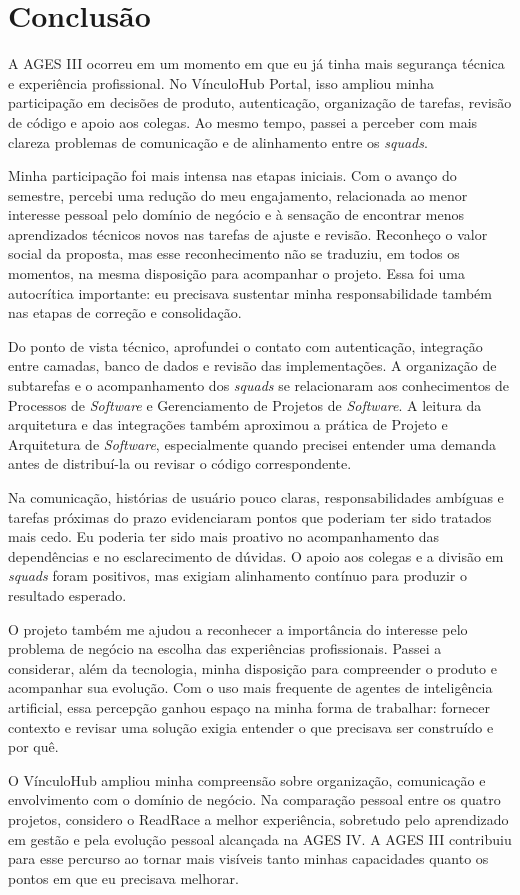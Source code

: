 \section{Conclusão}

A \ac{AGES} III ocorreu em um momento em que eu já tinha mais segurança técnica e experiência profissional. No VínculoHub Portal, isso ampliou minha participação em decisões de produto, autenticação, organização de tarefas, revisão de código e apoio aos colegas. Ao mesmo tempo, passei a perceber com mais clareza problemas de comunicação e de alinhamento entre os \textit{squads}.

Minha participação foi mais intensa nas etapas iniciais. Com o avanço do semestre, percebi uma redução do meu engajamento, relacionada ao menor interesse pessoal pelo domínio de negócio e à sensação de encontrar menos aprendizados técnicos novos nas tarefas de ajuste e revisão. Reconheço o valor social da proposta, mas esse reconhecimento não se traduziu, em todos os momentos, na mesma disposição para acompanhar o projeto. Essa foi uma autocrítica importante: eu precisava sustentar minha responsabilidade também nas etapas de correção e consolidação.

Do ponto de vista técnico, aprofundei o contato com autenticação, integração entre camadas, banco de dados e revisão das implementações. A organização de subtarefas e o acompanhamento dos \textit{squads} se relacionaram aos conhecimentos de Processos de \textit{Software} e Gerenciamento de Projetos de \textit{Software}. A leitura da arquitetura e das integrações também aproximou a prática de Projeto e Arquitetura de \textit{Software}, especialmente quando precisei entender uma demanda antes de distribuí-la ou revisar o código correspondente.

Na comunicação, histórias de usuário pouco claras, responsabilidades ambíguas e tarefas próximas do prazo evidenciaram pontos que poderiam ter sido tratados mais cedo. Eu poderia ter sido mais proativo no acompanhamento das dependências e no esclarecimento de dúvidas. O apoio aos colegas e a divisão em \textit{squads} foram positivos, mas exigiam alinhamento contínuo para produzir o resultado esperado.

O projeto também me ajudou a reconhecer a importância do interesse pelo problema de negócio na escolha das experiências profissionais. Passei a considerar, além da tecnologia, minha disposição para compreender o produto e acompanhar sua evolução. Com o uso mais frequente de agentes de inteligência artificial, essa percepção ganhou espaço na minha forma de trabalhar: fornecer contexto e revisar uma solução exigia entender o que precisava ser construído e por quê.

O VínculoHub ampliou minha compreensão sobre organização, comunicação e envolvimento com o domínio de negócio. Na comparação pessoal entre os quatro projetos, considero o ReadRace a melhor experiência, sobretudo pelo aprendizado em gestão e pela evolução pessoal alcançada na \ac{AGES} IV. A \ac{AGES} III contribuiu para esse percurso ao tornar mais visíveis tanto minhas capacidades quanto os pontos em que eu precisava melhorar.
